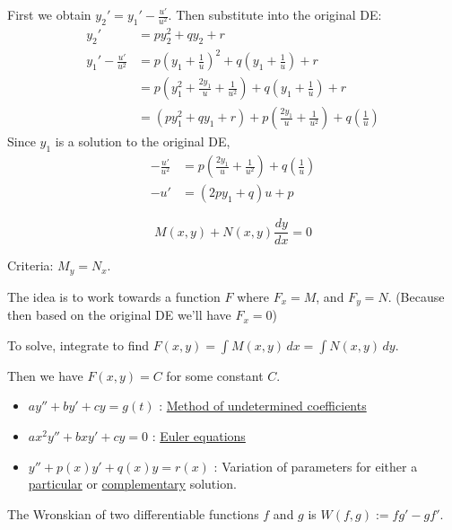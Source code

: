 \begin{compute}
  First we obtain $\displaystyle y_2'=y_1'-\frac{u'}{u^2}$. Then substitute into the original DE:
  \begin{align*}
    y_2' &= py_2^2+qy_2+r                                                                  \\
    y_1'-\frac{u'}{u^2}
         &= p\left(y_1+\frac1u\right)^2+q\left(y_1+\frac1u\right)+r                        \\
         &= p\left(y_1^2+\frac{2y_1}{u}+\frac1{u^2}\right)+q\left(y_1+\frac1u\right)+r     \\
         &= (py_1^2+qy_1+r)+p\left(\frac{2y_1}{u}+\frac1{u^2}\right)+q\left(\frac1u\right)
  \end{align*}
  Since $y_1$ is a solution to the original DE,
  \begin{align*}
    -\frac{u'}{u^2} &= p\left(\frac{2y_1}{u}+\frac1{u^2}\right)+q\left(\frac1u\right) \\
    -u'             &=(2py_1+q)u+p
  \end{align*}
\end{compute}

\label{db2397c}

$$M(x,y)+N(x,y)\frac{dy}{dx}=0$$

Criteria: $M_y=N_x$.

The idea is to work towards a function $F$ where $F_x=M$, and $F_y=N$. (Because
then based on the original DE we'll have $F_x=0$)

To solve, integrate to find $F(x,y)=\int M(x,y)\,dx=\int N(x,y)\,dy$.

Then we have $F(x,y)=C$ for some constant $C$.


\begin{itemize}
  \item $ay''+by'+cy=g(t)$ : \href{af8932c}{Method of undetermined
        coefficients}
  \item $ax^2y''+bxy'+cy=0$ : \href{c15a777}{Euler equations}
  \item $y''+p(x)y'+q(x)y=r(x)$ : Variation of parameters for either a
        \href{cc51fcb}{particular} or
        \href{d359b97}{complementary} solution.
\end{itemize}

\label{b70073b}

The Wronskian of two differentiable functions $f$ and $g$ is $W(f,g):=fg'-gf'$.

